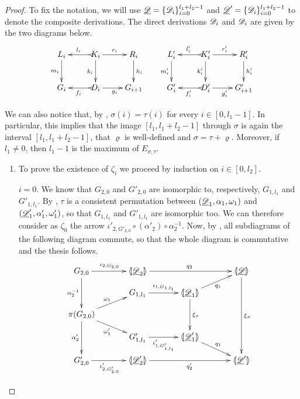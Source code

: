 \begin{proof}
	To fix the notation, we will use $\underline{\mathscr{D}}=\{\mathscr{D}_i\}_{i=0}^{l_1+l_2-1}$ and $\underline{\mathscr{D}}'=\{\mathscr{D}_i\}_{i=0}^{l_1+l_2-1}$ to denote the composite derivations. The direct derivations $\mathscr{D}_i$ and $\mathscr{D}_i$ are given by the two diagrams below.
	\[\xymatrix{L_i \ar[d]_{m_i}& K_i \ar[r]^{r_i} \ar@{>->}[l]_{l_i} \ar[d]_{k_i}& R_i \ar[d]^{h_i}& L'_i \ar[d]_{m'_i} & K'_i \ar[d]_{k'_i} \ar[r]^{r'_i} \ar@{>->}[l]_{l'_i} & R'_i \ar[d]^{h'_i}\\ G_i & D_i \ar[r]_{g_i} \ar@{>->}[l]^{f_i} & G_{i+1} & G'_i & D'_i \ar[r]_{g'_i} \ar@{>->}[l]^{f'_i} & G'_{i+1}}\]
	
	We can also notice that,  by , $\sigma(i)=\tau(i)$ for every $i\in  [0, l_1-1]$. In particular, this implies that the image  $[l_1, l_1+l_2-1]$ through $\sigma$ is again the interval $[l_1, l_1+l_2-1]$, that $\varrho$ is well-defined and $\sigma=\tau +\varrho$.  Moreover, if $l_1\neq 0$, then $l_1-1$ is the maximum of $E_{\sigma,\tau}$. 
	
	\begin{enumerate}
		\item 		To prove the existence of $\zeta_i$ we proceed by induction on $i\in [0, l_2]$.
		
		\smallskip \noindent $i=0$. We know that $G_{2,0}$ and $G'_{2,0}$ are isomorphic to, respectively, $G_{1, l_1}$ and $G'_{1, l_1}$. By , $\tau$ is a consistent permutation between $(\underline{\mathscr{D}}_1, \alpha_1, \omega_1)$ and $(\underline{\mathscr{D}}'_1, \alpha'_1, \omega'_1)$, so that $G_{1,l_1}$ and $G'_{1, l_1}$ are isomorphic too. We can therefore consider as $\zeta_0$ the arrow $\iota'_{2, G'_{2,0}}\circ (\alpha'_2)\circ \alpha^{-1}_2$. Now, by , all subdiagrams of the following diagram commute, so that the whole diagram is commutative and the thesis follows.
		\[\xymatrix@R=10pt@C=35pt{G_{2,0}\ar[r]^{\iota_{2, G_{2,0}}} \ar[dd]_{\alpha^{-1}_2}&\lpro \der{D}_2\rpro \ar[rr]^{q_2}&&\tpro{D}\ar[dddd]^{\xi_{\sigma}}\\& G_{1,l_1} \ar[r]^{\iota_{1, G_{1, l_1}}}& \lpro \der{D}_1\ar[dd]^{\xi_\tau} \ar[ur]_{q_1} \rpro \\\pi(G_{2,0}) \ar[ur]^{\omega_1}\ar[dr]_{\omega'_1} \\ & G'_{1,l_1} \ar[r]_{\iota'_{1, G'_{1, l_1}}}& \lpro \der{D}'_1 \rpro \ar[dr]^{q_1}\\G'_{2,0} \ar@{<-}[uu]^{\alpha'_2}\ar[r]_{\iota'_{2, G'_{2,0}}}&\lpro \der{D}'_2\rpro \ar[rr]_{q'_2}&& \lpro \der{D}'\rpro }\]
		

\end{enumerate}
\end{proof}

